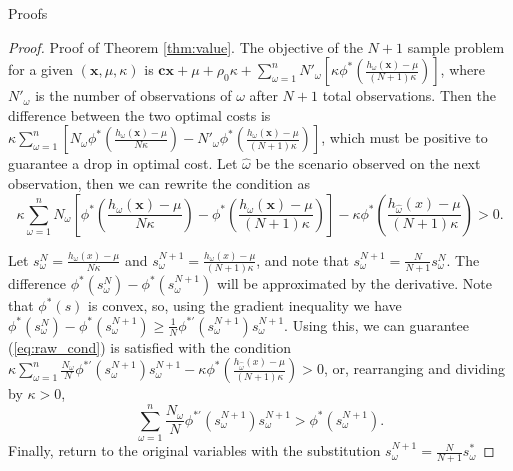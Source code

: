 \documentclass[ijoc,letterpaper]{informs3} %
\newcommand{\x}{\mathbf{x}}
\renewcommand{\c}{\mathbf{c}}
\begin{document}
\begin{APPENDIX}{Proofs}
\begin{proof}{\sc Proof of Theorem \ref{thm:value}.}
	The objective of the $N+1$ sample problem for a given $(\x,\mu,\kappa)$ is $\c\x + \mu + \rho_0 \kappa + \sum_{\omega = 1}^n N'_\omega \left[ \kappa \phi^*\left(\frac{h_\omega(\x) - \mu}{(N+1)\kappa} \right) \right]$,	where $N'_\omega$ is the number of observations of $\omega$ after $N+1$ total observations.
	Then the difference between the two optimal costs is $\kappa \sum_{\omega=1}^n \left[ N_\omega \phi^*\left(\frac{h_\omega(\x) - \mu}{N\kappa} \right) - N'_\omega \phi^*\left(\frac{h_\omega(\x) - \mu}{(N+1)\kappa} \right) \right]$, which must be positive to guarantee a drop in optimal cost.
	Let $\hat{\omega}$ be the scenario observed on the next observation, then we can rewrite the condition as
	\begin{equation} \label{eq:raw_cond}
		\kappa \sum_{\omega=1}^n N_\omega \left[ \phi^*\left(\frac{h_\omega(\x) - \mu}{N\kappa} \right) - \phi^*\left(\frac{h_\omega(\x) - \mu}{(N+1)\kappa} \right) \right] - \kappa \phi^*\left(\frac{h_{\hat{\omega}}(x) - \mu}{(N+1)\kappa}\right) > 0.
	\end{equation}

	Let $s^N_\omega = \frac{h_\omega(x) - \mu}{N\kappa}$ and $s^{N+1}_\omega = \frac{h_\omega(x) - \mu}{(N+1)\kappa}$, and note that $s^{N+1}_\omega = \tfrac{N}{N+1} s^N_\omega$.
	The difference $\phi^*(s^N_\omega) - \phi^*(s^{N+1}_\omega)$ will be approximated by the derivative.
Note that $\phi^*(s)$ is convex, so, using the gradient inequality we have $\phi^*(s^N_\omega) - \phi^*(s^{N+1}_\omega) \geq \frac{1}{N} \phi^{*\prime}(s^{N+1}_\omega) s^{N+1}_\omega$. 
	Using this, we can guarantee (\ref{eq:raw_cond}) is satisfied with the condition $\kappa \sum_{\omega=1}^n \frac{N_\omega}{N} \phi^{*\prime}(s^{N+1}_\omega) s^{N+1}_\omega - \kappa \phi^*\left(\frac{h_{\hat{\omega}}(x) - \mu}{(N+1)\kappa}\right) > 0$, or, rearranging and dividing by $\kappa > 0$,
	\begin{equation} \label{eq:main_value_derivation}
		\sum_{\omega=1}^n \frac{N_\omega}{N} \phi^{*\prime}(s^{N+1}_\omega) s^{N+1}_\omega > \phi^*(s^{N+1}_\omega).
	\end{equation}
	Finally, return to the original variables with the substitution $s^{N+1}_\omega = \frac{N}{N+1} s^*_\omega$
	\Halmos
\end{proof}



\end{APPENDIX}
\end{document}
